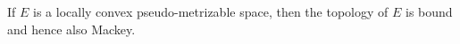 If $E$ is a locally convex pseudo-metrizable space, then the topology of $E$ is bound and hence also Mackey.
